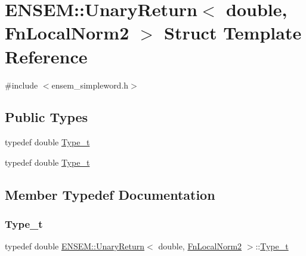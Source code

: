 \hypertarget{structENSEM_1_1UnaryReturn_3_01double_00_01FnLocalNorm2_01_4}{}\section{E\+N\+S\+EM\+:\+:Unary\+Return$<$ double, Fn\+Local\+Norm2 $>$ Struct Template Reference}
\label{structENSEM_1_1UnaryReturn_3_01double_00_01FnLocalNorm2_01_4}


{\ttfamily \#include $<$ensem\+\_\+simpleword.\+h$>$}

\subsection*{Public Types}
\begin{DoxyCompactItemize}
\item 
typedef double \mbox{\hyperlink{structENSEM_1_1UnaryReturn_3_01double_00_01FnLocalNorm2_01_4_aeffdb3ddbb9a4422627961295ff3ee26}{Type\+\_\+t}}
\item 
typedef double \mbox{\hyperlink{structENSEM_1_1UnaryReturn_3_01double_00_01FnLocalNorm2_01_4_aeffdb3ddbb9a4422627961295ff3ee26}{Type\+\_\+t}}
\end{DoxyCompactItemize}


\subsection{Member Typedef Documentation}
\mbox{\label{structENSEM_1_1UnaryReturn_3_01double_00_01FnLocalNorm2_01_4_aeffdb3ddbb9a4422627961295ff3ee26}} 
\subsubsection{\texorpdfstring{Type\_t}{Type\_t}\hspace{0.1cm}{\footnotesize\ttfamily [1/2]}}
{\footnotesize\ttfamily typedef double \mbox{\hyperlink{structENSEM_1_1UnaryReturn}{E\+N\+S\+E\+M\+::\+Unary\+Return}}$<$ double, \mbox{\hyperlink{structENSEM_1_1FnLocalNorm2}{Fn\+Local\+Norm2}} $>$\+::\mbox{\hyperlink{structENSEM_1_1UnaryReturn_3_01double_00_01FnLocalNorm2_01_4_aeffdb3ddbb9a4422627961295ff3ee26}{Type\+\_\+t}}}

